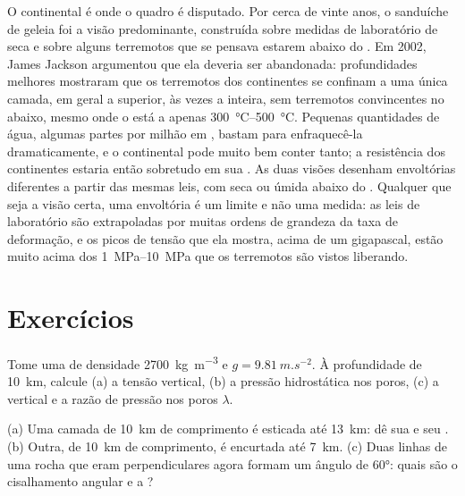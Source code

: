 O  continental é onde o quadro é disputado. Por cerca de vinte anos, o sanduíche de geleia foi a visão predominante, construída sobre medidas de laboratório de  seca e sobre alguns terremotos que se pensava estarem abaixo do . Em 2002, James Jackson argumentou que ela deveria ser abandonada: profundidades melhores mostraram que os terremotos dos continentes se confinam a uma única camada, em geral a  superior, às vezes a  inteira, sem terremotos convincentes no  abaixo, mesmo onde o  está a apenas \qtyrange{300}{500}{\degreeCelsius}. Pequenas quantidades de água, algumas partes por milhão em , bastam para enfraquecê-la dramaticamente, e o  continental pode muito bem conter tanto; a resistência dos continentes estaria então sobretudo em sua . As duas visões desenham envoltórias diferentes a partir das mesmas leis, com  seca ou úmida abaixo do .
Qualquer que seja a visão certa, uma envoltória é um limite e não uma medida: as leis de laboratório são extrapoladas por muitas ordens de grandeza da taxa de deformação, e os picos de tensão que ela mostra, acima de um gigapascal, estão muito acima dos \qtyrange{1}{10}{MPa} que os terremotos são vistos liberando.

\section{Exercícios}

\begin{exercise}[$\star$]\label{exo:b1:stress-strain-rheology:1}
Tome uma  de densidade \qty{2700}{kg.m^{-3}} e $g = \qty{9.81}{m.s^{-2}}$. À profundidade de \qty{10}{km}, calcule (a) a tensão vertical, (b) a pressão hidrostática nos poros, (c) a  vertical e a razão de pressão nos poros
$\lambda$.
\end{exercise}

\begin{exercise}[$\star$]\label{exo:b1:stress-strain-rheology:2}
(a) Uma camada de \qty{10}{km} de comprimento é esticada até \qty{13}{km}: dê sua  e seu . (b) Outra, de \qty{10}{km} de comprimento, é encurtada até \qty{7}{km}. (c) Duas linhas de uma rocha que eram perpendiculares agora formam um ângulo de \ang{60}: quais são o cisalhamento angular e a ?
\end{exercise}

